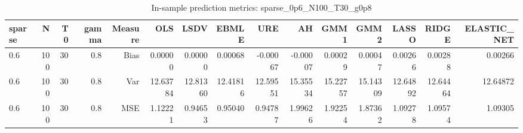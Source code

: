 \begin{table}[!htbp]\centering
\caption{In-sample prediction metrics: sparse_0p6_N100_T30_g0p8}
\label{tab:table2_sparse_0p6_N100_T30_g0p8}
\begin{tabular}{lrrrrrrrrrrrrrr}
\hline
sparse & N & T0 & gamma & Measure & OLS & LSDV & EBMLE & URE & AH & GMM1 & GMM2 & LASSO & RIDGE & ELASTIC_NET \\
\hline
0.6 & 100 & 30 & 0.8 & Bias & 0.00000 & 0.00000 & 0.00068 & -0.00067 & -0.00007 & 0.00029 & 0.00047 & 0.00266 & 0.00288 & 0.00266 \\
0.6 & 100 & 30 & 0.8 & Var & 12.63784 & 12.81360 & 12.41816 & 12.59551 & 15.35534 & 15.22757 & 15.14309 & 12.64892 & 12.64464 & 12.64872 \\
0.6 & 100 & 30 & 0.8 & MSE & 1.12221 & 0.94653 & 0.95040 & 0.94787 & 1.99626 & 1.92254 & 1.87362 & 1.09278 & 1.09574 & 1.09305 \\
\hline
\end{tabular}
\end{table}


